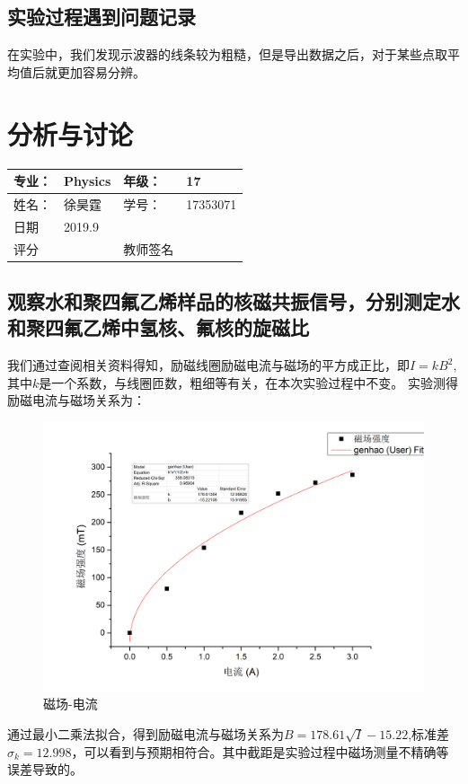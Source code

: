 \documentclass{ctexart}
\begin{document}
	\subsection{实验过程遇到问题记录}
	在实验中，我们发现示波器的线条较为粗糙，但是导出数据之后，对于某些点取平均值后就更加容易分辨。




\newpage
\section{分析与讨论}
\begin{tabular}{|p{8em}|p{8em}|p{8em}|p{8em}|}
	\hline 
	专业：     &Physics       &年级：      & 17     \\
	\hline
	姓名：& 徐昊霆 &学号：&17353071  \\
	\hline
	日期&     2019.9               & &  \\
	\hline	
	评分 & & 教师签名 & \\
	\hline
\end{tabular}
\subsection{观察水和聚四氟乙烯样品的核磁共振信号，分别测定水和聚四氟乙烯中氢核、氟核的旋磁比}
	我们通过查阅相关资料得知，励磁线圈励磁电流与磁场的平方成正比，即$I=kB^2$,其中$k$是一个系数，与线圈匝数，粗细等有关，在本次实验过程中不变。
	实验测得励磁电流与磁场关系为：
	\begin{figure}[H]
		\centering
		\includegraphics[scale=0.5]{磁场电流关系}
		\caption{磁场-电流}
	\end{figure}
	通过最小二乘法拟合，得到励磁电流与磁场关系为$B=178.61\sqrt{I}-15.22$,标准差$\sigma_k=12.998$，可以看到与预期相符合。其中截距是实验过程中磁场测量不精确等误差导致的。
	
\end{document}
